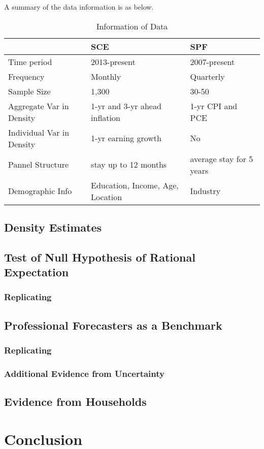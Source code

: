 \documentclass[]{article}
\begin{document}
A summary of the data information is as below. 

\begin{table}[]
			\caption{Information of Data}
	\begin{tabular}{lll}

		\hline 
		& SCE & SPF        \\
		\hline 
		Time period                                    & 2013-present                            & 2007-present             \\
		Frequency                                      & Monthly                                 & Quarterly                \\
		Sample Size                                    & 1,300                                   & 30-50                    \\
		Aggregate Var in Density                       & 1-yr  and 3-yr ahead inflation          & 1-yr CPI and PCE         \\
		Individual Var in Density                      & 1-yr earning growth                     & No                       \\
		Pannel Structure                               & stay up to 12 months                    & average stay for 5 years \\
		Demographic Info                        & Education, Income, Age, Location        & Industry    \\
		\hline 
	\end{tabular}
\end{table}


\subsection{Density Estimates}


\subsection{Test of Null Hypothesis of Rational Expectation}

\subsubsection{Replicating  \cite{fuhrer2018intrinsic}}

\subsection{Professional Forecasters as a Benchmark}

\subsubsection{Replicating \cite{coibion2012can}}

\subsubsection{Additional Evidence from Uncertainty}

\subsection{Evidence from Households}

\section{Conclusion}




\end{document}
